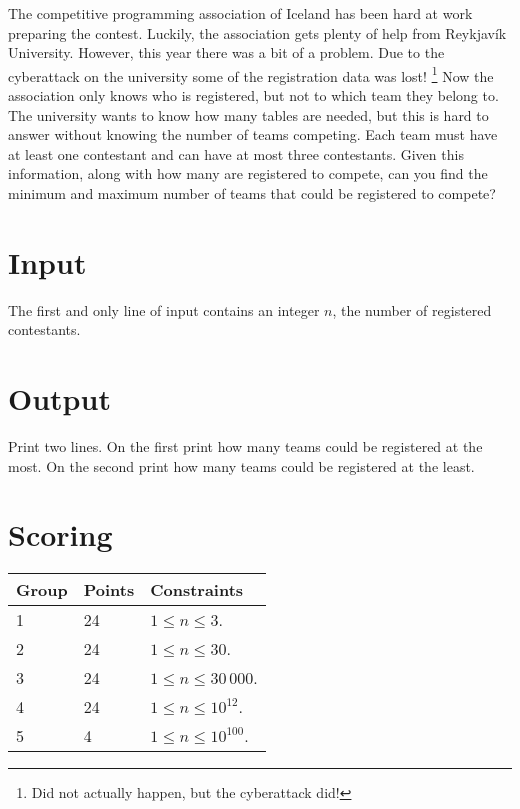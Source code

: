 
The competitive programming association of Iceland has been hard at work preparing the contest.
Luckily, the association gets plenty of help from Reykjavík University.
However, this year there was a bit of a problem.
Due to the cyberattack on the university some of the registration data was lost!
\footnote{Did not actually happen, but the cyberattack did!}
Now the association only knows who is registered, but not to which team they belong to.
The university wants to know how many tables are needed,
but this is hard to answer without knowing the number of teams competing.
Each team must have at least one contestant and can have at most three contestants.
Given this information, along with how many are registered to compete,
can you find the minimum and maximum number of teams that could be registered to compete?

\section*{Input}
The first and only line of input contains an integer $n$, the number of registered contestants.

\section*{Output}
Print two lines.
On the first print how many teams could be registered at the most.
On the second print how many teams could be registered at the least.

\section*{Scoring}
\begin{tabular}{|l|l|l|}
\hline
Group & Points & Constraints \\ \hline
1     & 24   & $1 \leq n \leq 3$. \\ \hline
2     & 24   & $1 \leq n \leq 30$. \\ \hline
3     & 24   & $1 \leq n \leq 30\,000$. \\ \hline
4     & 24   & $1 \leq n \leq 10^{12}$. \\ \hline
5     & 4    & $1 \leq n \leq 10^{100}$. \\ \hline
\end{tabular}
